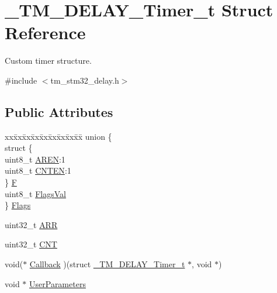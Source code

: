 \hypertarget{struct___t_m___d_e_l_a_y___timer__t}{}\section{\+\_\+\+T\+M\+\_\+\+D\+E\+L\+A\+Y\+\_\+\+Timer\+\_\+t Struct Reference}
\label{struct___t_m___d_e_l_a_y___timer__t}


Custom timer structure.  




{\ttfamily \#include $<$tm\+\_\+stm32\+\_\+delay.\+h$>$}

\subsection*{Public Attributes}
\begin{DoxyCompactItemize}
\item 
\begin{tabbing}
xx\=xx\=xx\=xx\=xx\=xx\=xx\=xx\=xx\=\kill
union \{\\
\>struct \{\\
\>\>uint8\_t \hyperlink{struct___t_m___d_e_l_a_y___timer__t_a1f3bc377ac159922473d6c06f1c73522}{AREN}:1\\
\>\>uint8\_t \hyperlink{struct___t_m___d_e_l_a_y___timer__t_acf0c4d077f4631ab0190a58c614dbfca}{CNTEN}:1\\
\>\} \hyperlink{struct___t_m___d_e_l_a_y___timer__t_a40b6046972a42f803c4419f2e38f03aa}{F}\\
\>uint8\_t \hyperlink{struct___t_m___d_e_l_a_y___timer__t_aa65211e90cc3a0081998ef3d562980bd}{FlagsVal}\\
\} \hyperlink{struct___t_m___d_e_l_a_y___timer__t_a6beb9f090d6c112ed5506fdf284f82bc}{Flags}\\

\end{tabbing}\item 
uint32\+\_\+t \hyperlink{struct___t_m___d_e_l_a_y___timer__t_a28d91cd581c439f87c95362664933101}{A\+RR}
\item 
uint32\+\_\+t \hyperlink{struct___t_m___d_e_l_a_y___timer__t_af853003aa6db01a3b266193fbc48ac65}{C\+NT}
\item 
void($\ast$ \hyperlink{struct___t_m___d_e_l_a_y___timer__t_ae32cf4569f33c997d7498f037aea8d9e}{Callback} )(struct \hyperlink{struct___t_m___d_e_l_a_y___timer__t}{\+\_\+\+T\+M\+\_\+\+D\+E\+L\+A\+Y\+\_\+\+Timer\+\_\+t} $\ast$, void $\ast$)
\item 
void $\ast$ \hyperlink{struct___t_m___d_e_l_a_y___timer__t_acdb9175c7724f3bc7df957dab22d913f}{User\+Parameters}
\end{DoxyCompactItemize}


